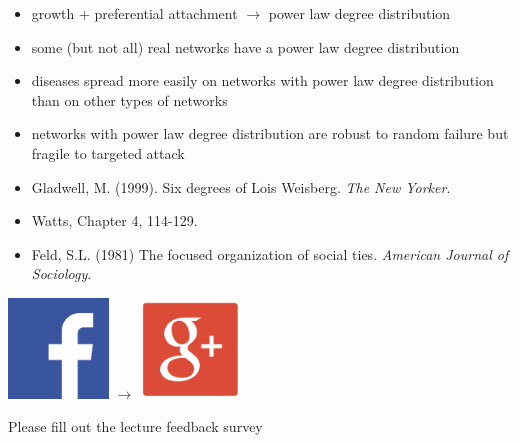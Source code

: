 \documentclass[aspectratio=169]{beamer}
\begin{document}
\begin{frame}

\begin{itemize}
\item growth + preferential attachment $\rightarrow$ power law degree distribution
\pause
\item some (but not all) real networks have a power law degree distribution 
\pause
\item diseases spread more easily on networks with power law degree distribution than on other types of networks
\pause
\item networks with power law degree distribution are robust to random failure but fragile to targeted attack
\end{itemize}


\end{frame}
\begin{frame}

\begin{itemize}
\item Gladwell, M. (1999). Six degrees of Lois Weisberg. \textit{The New Yorker}.
\item Watts, Chapter 4, 114-129.
\item Feld, S.L. (1981) The focused organization of social ties. \textit{American Journal of Sociology}.
\end{itemize}

\vfill
\includegraphics[width = 0.20\textwidth]{figures/fb_icon.png} {\LARGE $\rightarrow$} \includegraphics[width = 0.20\textwidth]{figures/google_plus.png}



\end{frame}
\begin{frame}

Please fill out the lecture feedback survey

\end{frame}
\end{document}
